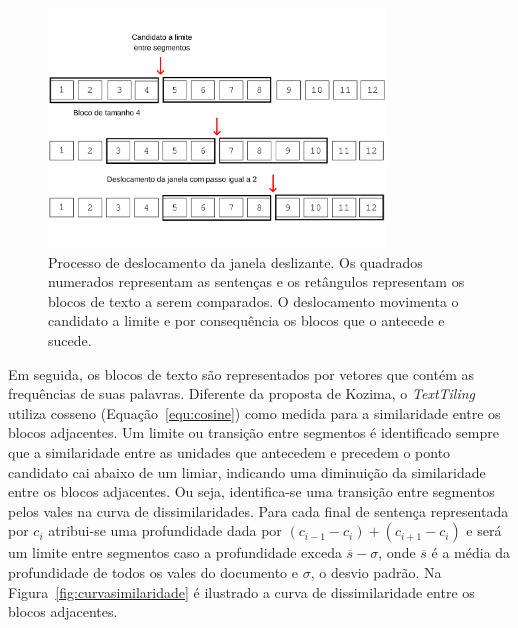 \begin{figure}[h!]
\center
	\includegraphics[trim={ 0 60 0 66 },clip,page=1,width=0.8\textwidth]{conteudo/capitulos/figs/janelas-deslizantes.pdf}

	\caption{Processo de deslocamento da janela deslizante. Os quadrados numerados representam as sentenças e os retângulos representam os blocos de texto a serem comparados. O deslocamento movimenta o candidato a limite e por consequência os blocos que o antecede e sucede.}
	\label{fig:TT-slidingwindow}
\end{figure}


Em seguida, os blocos de texto são representados por vetores que contém as frequências de suas palavras.  Diferente da proposta de Kozima, o \textit{TextTiling} utiliza cosseno (Equação~\ref{equ:cosine}) como medida para a similaridade entre os blocos adjacentes. Um limite ou transição entre segmentos é identificado sempre que a similaridade entre as unidades que antecedem e precedem o ponto candidato cai abaixo de um limiar, indicando uma diminuição da similaridade entre os blocos adjacentes. Ou seja, identifica-se uma transição entre segmentos pelos vales na curva de dissimilaridades. Para cada final de sentença representada por $c_i$ atribui-se uma profundidade dada por $(c_{i-1}-c_{i}) + (c_{i+1}-c_{i})$ e será um limite entre segmentos caso a profundidade exceda $\overline{s} - \sigma$, onde $\overline{s}$ é a média da profundidade de todos os vales do documento e $\sigma$, o desvio padrão. Na Figura~\ref{fig:curvasimilaridade} é ilustrado a curva de dissimilaridade entre os blocos adjacentes.  

